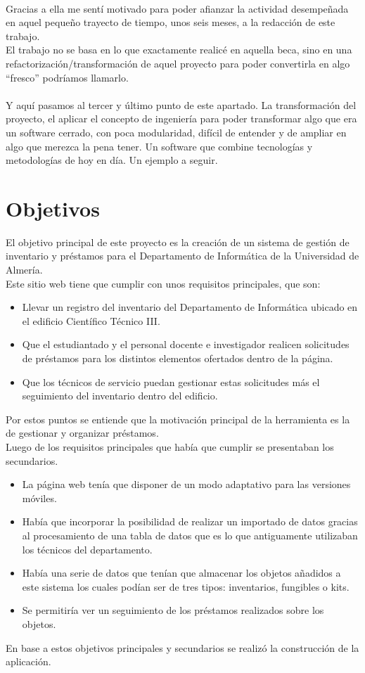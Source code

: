 \\Gracias a ella me sentí motivado para poder afianzar la actividad desempeñada en aquel pequeño trayecto de tiempo, unos seis meses, a la redacción de este trabajo.
\\El trabajo no se basa en lo que exactamente realicé en aquella beca, sino en una refactorización/transformación de aquel proyecto para poder convertirla en algo ``fresco'' podríamos llamarlo.
\\\\Y aquí pasamos al tercer y último punto de este apartado. La transformación del proyecto, el aplicar el concepto de ingeniería para poder transformar algo que era un software cerrado, con poca modularidad, difícil de entender y de ampliar en algo que merezca la pena tener. Un software que combine tecnologías y metodologías de hoy en día. Un ejemplo a seguir.

\section{Objetivos}

El objetivo principal de este proyecto es la creación de un sistema de gestión de inventario y préstamos para el Departamento de Informática de la Universidad de Almería.
\\Este sitio web tiene que cumplir con unos requisitos principales, que son:

\begin{itemize}
    \item Llevar un registro del inventario del Departamento de Informática ubicado en el edificio Científico Técnico III.
    \item Que el estudiantado y el personal docente e investigador realicen solicitudes de préstamos para los distintos elementos ofertados dentro de la página.
    \item Que los técnicos de servicio puedan gestionar estas solicitudes más el seguimiento del inventario dentro del edificio.
\end{itemize}
Por estos puntos se entiende que la motivación principal de la herramienta es la de gestionar y organizar préstamos.
\\Luego de los requisitos principales que había que cumplir se presentaban los secundarios.

\begin{itemize}
    \item La página web tenía que disponer de un modo adaptativo para las versiones móviles.
    \item Había que incorporar la posibilidad de realizar un importado de datos gracias al procesamiento de una tabla de datos que es lo que antiguamente utilizaban los técnicos del departamento.
    \item Había una serie de datos que tenían que almacenar los objetos añadidos a este sistema los cuales podían ser de tres tipos: inventarios, fungibles o kits.
    \item Se permitiría ver un seguimiento de los préstamos realizados sobre los objetos.
\end{itemize}
En base a estos objetivos principales y secundarios se realizó la construcción de la aplicación.

